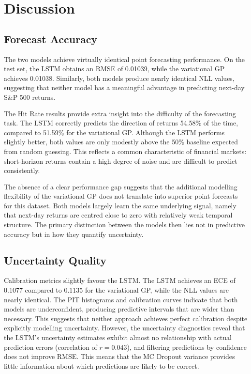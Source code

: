 \section{Discussion}\label{sec:discussion}

\subsection{Forecast Accuracy}

The two models achieve virtually identical point forecasting performance. On the test set, the LSTM obtains an RMSE of 0.01039, while the variational GP achieves 0.01038. Similarly, both models produce nearly identical NLL values, suggesting that neither model has a meaningful advantage in predicting next-day S\&P 500 returns.

The Hit Rate results provide extra insight into the difficulty of the forecasting task. The LSTM correctly predicts the direction of returns 54.58\% of the time, compared to 51.59\% for the variational GP. Although the LSTM performs slightly better, both values are only modestly above the 50\% baseline expected from random guessing. This reflects a common characteristic of financial markets: short-horizon returns contain a high degree of noise and are difficult to predict consistently.

The absence of a clear performance gap suggests that the additional modelling flexibility of the variational GP does not translate into superior point forecasts for this dataset. Both models largely learn the same underlying signal, namely that next-day returns are centred close to zero with relatively weak temporal structure. The primary distinction between the models then lies not in predictive accuracy but in how they quantify uncertainty.

\subsection{Uncertainty Quality}

Calibration metrics slightly favour the LSTM. The LSTM achieves an ECE of 0.1077 compared to 0.1135 for the variational GP, while the NLL values are nearly identical. The PIT histograms and calibration curves indicate that both models are underconfident, producing predictive intervals that are wider than necessary. This suggests that neither approach achieves perfect calibration despite explicitly modelling uncertainty. However, the uncertainty diagnostics reveal that the LSTM's uncertainty estimates exhibit almost no relationship with actual prediction errors (correlation of $r = 0.043$), and filtering predictions by confidence does not improve RMSE. This means that the MC Dropout variance provides little information about which predictions are likely to be correct.

